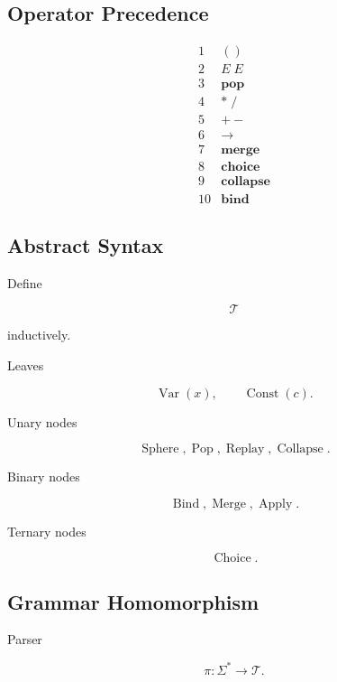 \documentclass[12pt,oneside]{article}
\theoremstyle{definition}
\theoremstyle{remark}
\begin{document}
\subsection*{Operator Precedence}

\[
\begin{array}{ll}
1&
()
\\
2&
E\;E
\\
3&
\mathbf{pop}
\\
4&
*
\;/
\\
5&
+
-
\\
6&
\rightarrow
\\
7&
\mathbf{merge}
\\
8&
\mathbf{choice}
\\
9&
\mathbf{collapse}
\\
10&
\mathbf{bind}
\end{array}
\]

\subsection*{Abstract Syntax}

Define

\[
\mathcal T
\]

inductively.

Leaves

\[
\operatorname{Var}(x),
\qquad
\operatorname{Const}(c).
\]

Unary nodes

\[
\operatorname{Sphere},
\operatorname{Pop},
\operatorname{Replay},
\operatorname{Collapse}.
\]

Binary nodes

\[
\operatorname{Bind},
\operatorname{Merge},
\operatorname{Apply}.
\]

Ternary nodes

\[
\operatorname{Choice}.
\]

\subsection*{Grammar Homomorphism}

Parser

\[
\pi
:
\Sigma^*
\rightarrow
\mathcal T.
\]
\end{document}
